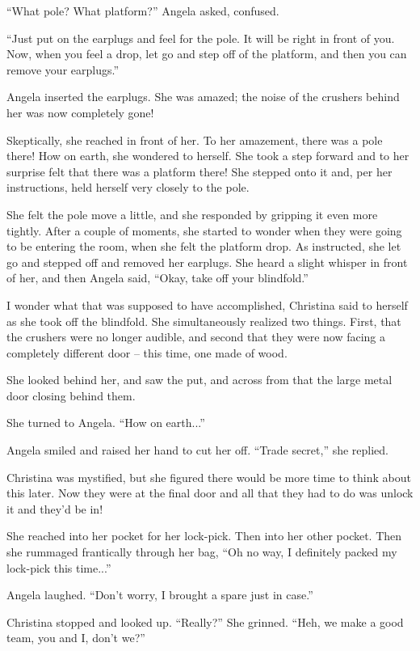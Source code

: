 \documentclass[showtrims,b6paper,draft,10pt]{memoir}
\begin{document}
``What pole?  What platform?''  Angela asked, confused.

``Just put on the earplugs and feel for the pole.  It will be right in front of you.  Now, when you feel a drop, let go and step off of the platform, and then you can remove your earplugs.''

Angela inserted the earplugs.  She was amazed;  the noise of the crushers behind her was now completely gone!

Skeptically, she reached in front of her.  To her amazement, there was a pole there!  How on earth, she wondered to herself.  She took a step forward and to her surprise felt that there was a platform there!  She stepped onto it and, per her instructions, held herself very closely to the pole.

She felt the pole move a little, and she responded by gripping it even more tightly.  After a couple of moments, she started to wonder when they were going to be entering the room, when she felt the platform drop.  As instructed, she let go and stepped off and removed her earplugs.  She heard a slight whisper in front of her, and then Angela said,  ``Okay, take off your blindfold.''

I wonder what that was supposed to have accomplished, Christina said to herself as she took off the blindfold.  She simultaneously realized two things.  First, that the crushers were no longer audible, and second that they were now facing a completely different door -- this time, one made of wood.

She looked behind her, and saw the put, and across from that the large metal door closing behind them.

She turned to Angela.  ``How on earth...''

Angela smiled and raised her hand to cut her off.  ``Trade secret,'' she replied.

Christina was mystified, but she figured there would be more time to think about this later.  Now they were at the final door and all that they had to do was unlock it and they'd be in!

She reached into her pocket for her lock-pick.  Then into her other pocket.  Then she rummaged frantically through her bag,  ``Oh no way, I definitely packed my lock-pick this time...''

Angela laughed.  ``Don't worry, I brought a spare just in case.''

Christina stopped and looked up.  ``Really?''  She grinned.  ``Heh, we make a good team, you and I, don't we?''
\end{document}
